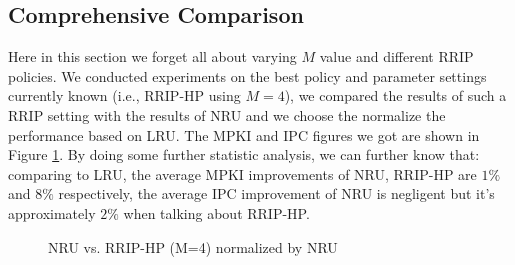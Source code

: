 \documentclass[conference]{IEEEtran}
\begin{document}
\subsection{Comprehensive Comparison}
Here in this section we forget all about varying $M$ value and different RRIP policies. We conducted experiments on the best policy and parameter settings currently known (i.e., RRIP-HP using $M=4$), we compared the results of such a RRIP setting with the results of NRU and we choose the normalize the performance based on LRU. The MPKI and IPC figures we got are shown in Figure \ref{rrip_nru_comp}. By doing some further statistic analysis, we can further know that: comparing to LRU, the average MPKI improvements of NRU, RRIP-HP are $1\%$ and $8\%$ respectively, the average IPC improvement of NRU is negligent but it's approximately $2\%$ when talking about RRIP-HP.
\begin{figure}
  \centering
  \caption{NRU vs. RRIP-HP (M=4) normalized by NRU}
  \label{rrip_nru_comp} %
\end{figure}


%
%
\end{document}
